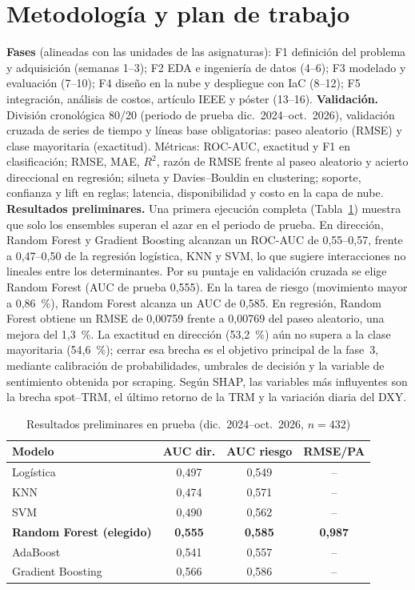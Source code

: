 \documentclass[conference]{IEEEtran}
\begin{document}
\section{Metodología y plan de trabajo}
\textbf{Fases} (alineadas con las unidades de las asignaturas): F1 definición del problema y adquisición (semanas 1--3); F2 EDA e ingeniería de datos (4--6); F3 modelado y evaluación (7--10); F4 diseño en la nube y despliegue con IaC (8--12); F5 integración, análisis de costos, artículo IEEE y póster (13--16).
\textbf{Validación.} División cronológica 80/20 (periodo de prueba dic.~2024--oct.~2026), validación cruzada de series de tiempo y líneas base obligatorias: paseo aleatorio (RMSE) y clase mayoritaria (exactitud). Métricas: ROC-AUC, exactitud y F1 en clasificación; RMSE, MAE, $R^2$, razón de RMSE frente al paseo aleatorio y acierto direccional en regresión; silueta y Davies--Bouldin en clustering; soporte, confianza y lift en reglas; latencia, disponibilidad y costo en la capa de nube.
\textbf{Resultados preliminares.} Una primera ejecución completa (Tabla~\ref{tab:prelim}) muestra que solo los ensembles superan el azar en el periodo de prueba. En dirección, Random Forest y Gradient Boosting alcanzan un ROC-AUC de 0,55--0,57, frente a 0,47--0,50 de la regresión logística, KNN y SVM, lo que sugiere interacciones no lineales entre los determinantes. Por su puntaje en validación cruzada se elige Random Forest (AUC de prueba 0,555). En la tarea de riesgo (movimiento mayor a 0,86~\%), Random Forest alcanza un AUC de 0,585. En regresión, Random Forest obtiene un RMSE de 0,00759 frente a 0,00769 del paseo aleatorio, una mejora del 1,3~\%. La exactitud en dirección (53,2~\%) aún no supera a la clase mayoritaria (54,6~\%); cerrar esa brecha es el objetivo principal de la fase~3, mediante calibración de probabilidades, umbrales de decisión y la variable de sentimiento obtenida por scraping. Según SHAP, las variables más influyentes son la brecha spot--TRM, el último retorno de la TRM y la variación diaria del DXY.

\begin{table}[t]
\caption{Resultados preliminares en prueba (dic.~2024--oct.~2026, $n=432$)}
\label{tab:prelim}
\centering
\begin{tabular}{@{}lccc@{}}
\toprule
Modelo & AUC dir. & AUC riesgo & RMSE/PA \\
\midrule
Logística & 0,497 & 0,549 & -- \\
KNN & 0,474 & 0,571 & -- \\
SVM & 0,490 & 0,562 & -- \\
\textbf{Random Forest (elegido)} & \textbf{0,555} & \textbf{0,585} & \textbf{0,987} \\
AdaBoost & 0,541 & 0,557 & -- \\
Gradient Boosting & 0,566 & 0,586 & -- \\
\bottomrule
\end{tabular}
\end{table}
\end{document}
